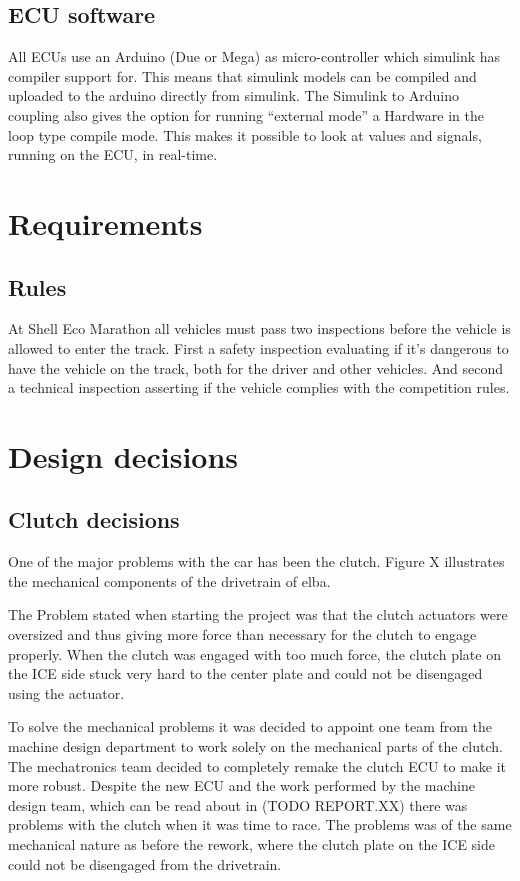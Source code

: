\subsection{ECU software}
All ECUs use an Arduino (Due or Mega) as micro-controller which simulink has
compiler support for. This means that simulink models can be compiled and
uploaded to the arduino directly from simulink. The Simulink to Arduino coupling also
gives the option for running ``external mode'' a Hardware in the loop type compile mode.
This makes it possible to look at values and signals, running on the ECU, in
real-time.
 
\section{Requirements}
\subsection{Rules}
At Shell Eco Marathon all vehicles must pass two inspections before the vehicle is allowed to enter the track. First a safety inspection evaluating if it's dangerous to have the vehicle on the track, both for the driver and other vehicles. And second a technical inspection asserting if the vehicle complies with the competition rules.

\section{Design decisions}
\subsection{Clutch decisions}

One of the major problems with the car has been the clutch. Figure X illustrates the mechanical components of the drivetrain of elba.

The Problem stated when starting the project was that the clutch actuators were oversized and thus giving more force than necessary for the clutch to engage properly. When the clutch was engaged with too much force, the clutch plate on the ICE side stuck very hard to the center plate and could not be disengaged using the actuator.

To solve the mechanical problems it was decided to appoint one team from the machine design department to work solely on the mechanical parts of the clutch. The mechatronics team decided to completely remake the clutch ECU to make it more robust. Despite the new ECU and the work performed by the machine design team, which can be read about in (TODO REPORT.XX) there was problems with the clutch when it was time to race. The problems was of the same mechanical nature as before the rework, where the clutch plate on the ICE side could not be disengaged from the drivetrain.

